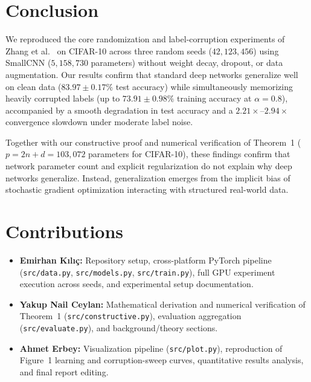 \documentclass[12pt,a4paper]{article}
\theoremstyle{definition}
\theoremstyle{remark}
\begin{document}
\section{Conclusion}
\label{sec:conclusion}

We reproduced the core randomization and label-corruption experiments of
Zhang et al.~\cite{zhang2017understanding} on CIFAR-10 across three random
seeds ($42, 123, 456$) using SmallCNN ($5{,}158{,}730$ parameters) without
weight decay, dropout, or data augmentation. Our results confirm that
standard deep networks generalize well on clean data ($83.97 \pm 0.17\%$ test
accuracy) while simultaneously memorizing heavily corrupted labels (up to
$73.91 \pm 0.98\%$ training accuracy at $\alpha = 0.8$), accompanied by a
smooth degradation in test accuracy and a $2.21\times$--$2.94\times$
convergence slowdown under moderate label noise.

Together with our constructive proof and numerical verification of Theorem~1
($p = 2n + d = 103{,}072$ parameters for CIFAR-10), these findings confirm that
network parameter count and explicit regularization do not explain why deep
networks generalize. Instead, generalization emerges from the implicit bias of
stochastic gradient optimization interacting with structured real-world data.

\section*{Contributions}

\begin{itemize}
  \item \textbf{Emirhan Kılıç:} Repository setup, cross-platform PyTorch pipeline (\texttt{src/data.py}, \texttt{src/models.py}, \texttt{src/train.py}), full GPU experiment execution across seeds, and experimental setup documentation.
  \item \textbf{Yakup Nail Ceylan:} Mathematical derivation and numerical verification of Theorem~1 (\texttt{src/constructive.py}), evaluation aggregation (\texttt{src/evaluate.py}), and background/theory sections.
  \item \textbf{Ahmet Erbey:} Visualization pipeline (\texttt{src/plot.py}), reproduction of Figure~1 learning and corruption-sweep curves, quantitative results analysis, and final report editing.
\end{itemize}
\end{document}
